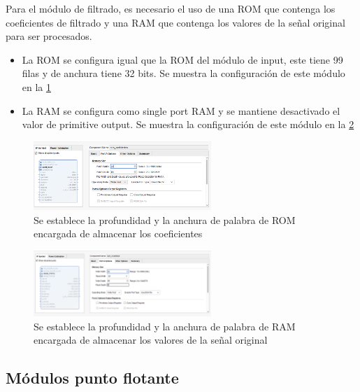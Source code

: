 Para el módulo de filtrado, es necesario el uso de una ROM que contenga los coeficientes de filtrado y una RAM que contenga los valores de la señal original para ser procesados.

\begin{itemize}
\item La ROM se configura igual que la ROM del módulo de input, este tiene 99 filas y de anchura 
tiene 32 bits. Se muestra la configuración de este módulo en la \cref{fig:romcoeficientesconf}
\item La RAM se configura como single port RAM y se mantiene desactivado el valor de primitive output.
Se muestra la configuración de este módulo en la \cref{fig:rammuestrasconf}

\end{itemize}

\begin{figure}[h!]
    \centering
    \includegraphics[width=0.6\textwidth]{./Images/img_implementacion_hw/romcoeficientesconf.png}
    \caption{Se establece la profundidad y la anchura de palabra de ROM encargada de almacenar los coeficientes}
    \label{fig:romcoeficientesconf}
\end{figure}

\begin{figure}[h!]
    \centering
    \includegraphics[width=0.6\textwidth]{./Images/img_implementacion_hw/rammuestrasconf.png}
    \caption{Se establece la profundidad y la anchura de palabra de RAM encargada de almacenar los valores de la señal original}
    \label{fig:rammuestrasconf}
\end{figure}
\FloatBarrier

\subsection{Módulos punto flotante}

